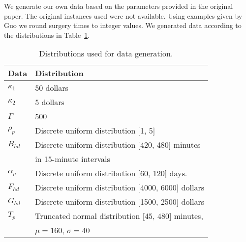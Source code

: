 We generate our own data based on the parameters provided in the original paper. The original instances used were not available. Using examples given by Guo\cite{guo} we round surgery times to integer values. We generated data according to the distributions in Table~\ref{tab:dataDist}.

\begin{table}[H]
    \centering
    \caption{Distributions used for data generation.}\label{tab:dataDist}
    \begin{tabular}{ll} \toprule
        Data & Distribution \\\midrule
        $\kappa_1$ & 50 dollars \\
        $\kappa_2$ & 5 dollars \\
        $\Gamma$ & 500 \\
        $\rho_p$ & Discrete uniform distribution [1, 5] \\
        $B_{hd}$ & Discrete uniform distribution [420, 480] minutes  \\
        & \quad in 15-minute intervals \\
        $\alpha_p$ & Discrete uniform distribution [60, 120] days. \\
        $F_{hd}$ & Discrete uniform distribution [4000, 6000] dollars \\
        $G_{hd}$ & Discrete uniform distribution [1500, 2500] dollars \\
        $T_p$ & 
            Truncated normal distribution [45, 480] minutes, \\
        & \quad $\mu=160$, $\sigma=40$
         \\
        \bottomrule
    \end{tabular}
\end{table}